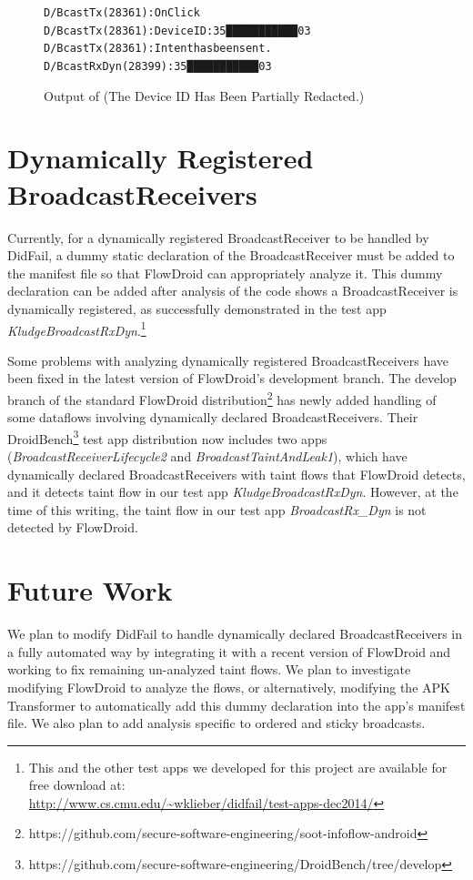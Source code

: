 \begin{figure}[!h]
\begin{framed}
\begin{alltt}
D/BcastTx (28361): OnClick
D/BcastTx (28361): DeviceID: 35███████████03
D/BcastTx (28361): Intent has been sent.
D/BcastRxDyn(28399): 35███████████03
\end{alltt}
\caption[Output of ]{Output of  (The Device ID Has Been Partially Redacted.)}
\label{fig:logcat-BcastDyn}
\end{framed}
\end{figure}

\section{Dynamically Registered BroadcastReceivers}
Currently, for a dynamically registered BroadcastReceiver to be handled by DidFail, a dummy static declaration of the BroadcastReceiver must be added to the manifest file so that FlowDroid can appropriately analyze it. This dummy declaration can be added after analysis of the code shows a BroadcastReceiver is dynamically registered, as successfully demonstrated in the test app \textit{KludgeBroadcastRxDyn}.\footnote{This and the other test apps we developed for this project are available for free download at: \\ {\url{http://www.cs.cmu.edu/~wklieber/didfail/test-apps-dec2014/}}}

Some problems with analyzing dynamically registered BroadcastReceivers have been fixed in the latest version of FlowDroid’s development branch. The develop branch of the standard FlowDroid distribution\footnote{https://github.com/secure-software-engineering/soot-infoflow-android} has newly added handling of some dataflows involving dynamically declared BroadcastReceivers. Their DroidBench\footnote{https://github.com/secure-software-engineering/DroidBench/tree/develop} test app distribution now includes two apps (\textit{BroadcastReceiverLifecycle2} and \textit{BroadcastTaintAndLeak1}), which have dynamically declared BroadcastReceivers with taint flows that FlowDroid detects, and it detects taint flow in our test app \textit{KludgeBroadcastRxDyn}. However, at the time of this writing, the taint flow in our test app \textit{BroadcastRx\_Dyn} is not detected by FlowDroid.

\section{Future Work}
We plan to modify DidFail to handle dynamically declared BroadcastReceivers in a fully automated way by integrating it with a recent version of FlowDroid and working to fix remaining un-analyzed taint flows. We plan to investigate modifying FlowDroid to analyze the flows, or alternatively, modifying the APK Transformer to automatically add this dummy declaration into the app’s manifest file. We also plan to add analysis specific to ordered and sticky broadcasts.


